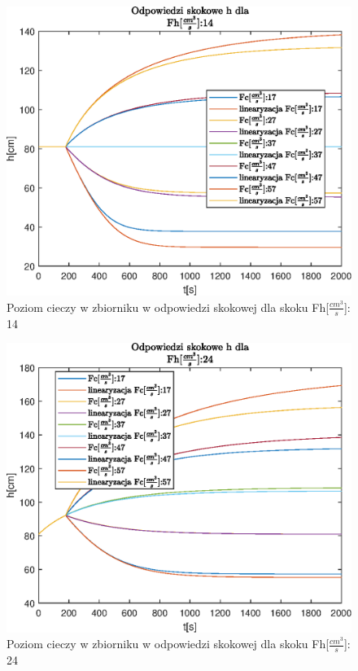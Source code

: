 \begin{figure}[h!]
   \centering
   \includegraphics{img/step-responses/h/stepResponseHFh14.eps}
   \caption{Poziom cieczy w zbiorniku w odpowiedzi skokowej dla skoku Fh[$\frac{cm^3}{s}$]: 14}
   \label{fig:stepResponseHFh14}
\end{figure}
            
\begin{figure}[h!]
   \centering
   \includegraphics{img/step-responses/h/stepResponseHFh24.eps}
   \caption{Poziom cieczy w zbiorniku w odpowiedzi skokowej dla skoku Fh[$\frac{cm^3}{s}$]: 24}
   \label{fig:stepResponseHFh24}
\end{figure}
            
